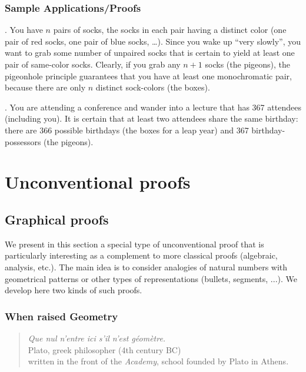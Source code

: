 \subsubsection{Sample Applications/Proofs}
\label{sec:pigeon-apps}

.
You have $n$ pairs of socks, the socks in each pair having a distinct
color (one pair of red socks, one pair of blue socks, \ldots).  Since
you wake up ``very slowly'', you want to grab some number of unpaired
socks that is certain to yield at least one pair of same-color socks.
Clearly, if you grab any $n+1$ socks (the pigeons), the pigeonhole
principle guarantees that you have at least one monochromatic pair,
because there are only $n$ distinct sock-colors (the boxes).

\medskip

.
You are attending a conference and wander into a lecture that has 367
attendees (including you).  It is certain that at least two attendees
share the same birthday: there are 366 possible birthdays (the boxes
for a leap year) and 367 birthday-possessors (the pigeons).



\section{Unconventional proofs}
\label{sec:unconventionalProofs}

\subsection{Graphical proofs}
\label{sec:graphicalproofs}

We present in this section a special type of unconventional proof
that is particularly interesting as a complement to more classical proofs (algebraic, analysis, etc.). 
The main idea is to consider analogies of natural numbers with geometrical patterns or other types of 
representations (bullets, segments, ...).
We develop here two kinds of such proofs. 

\subsubsection{When raised Geometry}

\begin{quote}
{\it Que nul n'entre ici s'il n'est g\'eom\`etre.} \\
\hspace*{2in} Plato, greek philosopher (4th century BC)\\
written in the front of the \textit{Academy}, school founded by Plato in Athens. 
\end{quote}
\medskip


